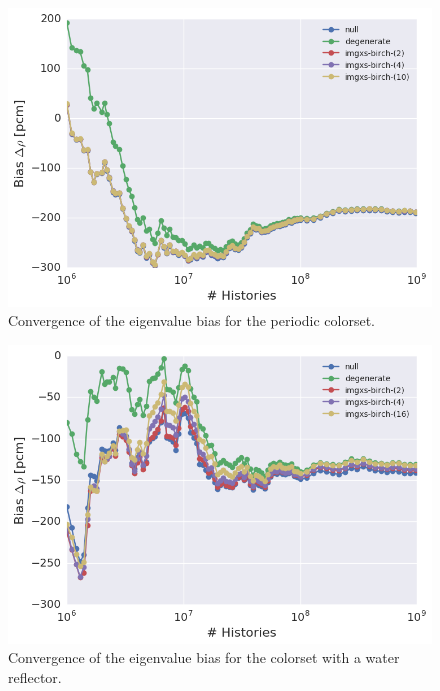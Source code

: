 \begin{figure}[h!]
\centering
\includegraphics[width=0.88\linewidth]{figures/results/convergence/2x2/keff-bias-evo}
\vspace{2mm}
\caption[Eigenvalue bias covergence for a 2$\times$2 colorset]{Convergence of the eigenvalue bias for the periodic colorset.}
\label{fig:chap11-2x2-eigenvalue-converge}
\end{figure}

\begin{figure}[h!]
\centering
\includegraphics[width=0.88\linewidth]{figures/results/convergence/reflector/keff-bias-evo}
\vspace{2mm}
\caption[Eigenvalue bias covergence for a 2$\times$2 colorset with reflector]{Convergence of the eigenvalue bias for the colorset with a water reflector.}
\label{fig:chap11-refl-eigenvalue-converge}
\end{figure}

\clearpage

